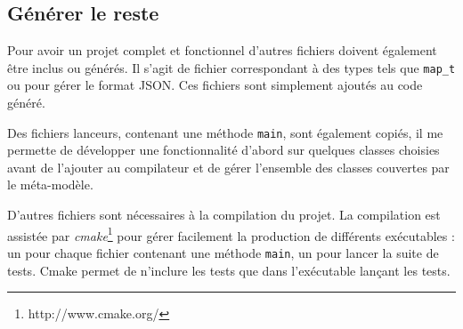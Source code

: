 \subsection{Générer le reste}

Pour avoir un projet complet et fonctionnel d'autres fichiers doivent également être inclus ou générés. Il s'agit de fichier correspondant à des types tels que \texttt{map\_t} ou pour gérer le format JSON. Ces fichiers sont simplement ajoutés au code généré.

Des fichiers lanceurs, contenant une méthode \texttt{main}, sont également copiés, il me permette de développer une fonctionnalité d'abord sur quelques classes choisies avant de l'ajouter au compilateur et de gérer l'ensemble des classes couvertes par le méta-modèle.

D'autres fichiers sont nécessaires à la compilation du projet. La compilation est assistée par \emph{cmake}\footnote{http://www.cmake.org/} pour gérer facilement la production de différents exécutables : un pour chaque fichier contenant une méthode \texttt{main}, un pour lancer la suite de tests. Cmake permet de n'inclure les tests que dans l'exécutable lançant les tests.